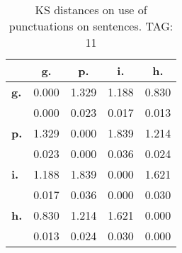 \begin{table}[h!]
\begin{center}
\begin{tabular}{| l || c | c | c | c |}\hline
 & {\bf g.} & {\bf p.} & {\bf i.} & {\bf h.} \\\hline\hline
{\bf g.} & 0.000 & 1.329 & 1.188 & 0.830 \\
{\bf } & 0.000 & 0.023 & 0.017 & 0.013 \\\hline
{\bf p.} & 1.329 & 0.000 & 1.839 & 1.214 \\
{\bf } & 0.023 & 0.000 & 0.036 & 0.024 \\\hline
{\bf i.} & 1.188 & 1.839 & 0.000 & 1.621 \\
{\bf } & 0.017 & 0.036 & 0.000 & 0.030 \\\hline
{\bf h.} & 0.830 & 1.214 & 1.621 & 0.000 \\
{\bf } & 0.013 & 0.024 & 0.030 & 0.000 \\\hline
\end{tabular}
\caption{KS distances on use of punctuations on sentences. TAG: 11}
\end{center}
\end{table}